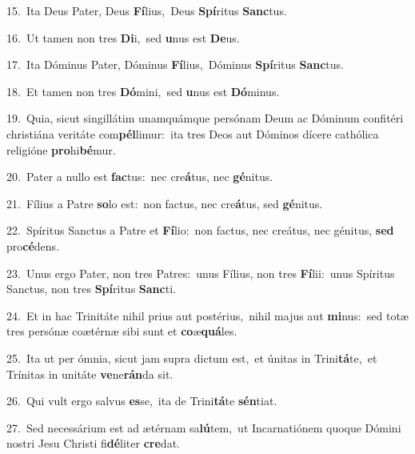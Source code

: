 {\numbfont\textcolor{\numbcolor}{15.}}~Ita Deus Pater, Deus \textbf{Fí}\-lius,~\star Deus \textbf{Spí}\-ritus \textbf{Sanc}\-tus.\par
{\numbfont\textcolor{\numbcolor}{16.}}~Ut tamen non tres \textbf{Di}\-i,~\star sed \textbf{u}\-nus est \textbf{De}\-us.\par
{\numbfont\textcolor{\numbcolor}{17.}}~Ita Dóminus Pater, Dóminus \textbf{Fí}\-lius,~\star Dóminus \textbf{Spí}\-ritus \textbf{Sanc}\-tus.\par
{\numbfont\textcolor{\numbcolor}{18.}}~Et tamen non tres \textbf{Dó}\-mini,~\star sed \textbf{u}\-nus est \textbf{Dó}\-minus.\par
{\numbfont\textcolor{\numbcolor}{19.}}~Quia, sicut singillátim unamquámque persónam Deum ac Dóminum confitéri christiána veritáte com\-\textbf{pél}\-limur:~\star ita tres Deos aut Dóminos dícere cathólica religióne \textbf{pro}\-hi\-\textbf{bé}\-mur.\par
{\numbfont\textcolor{\numbcolor}{20.}}~Pater a nullo est \textbf{fac}\-tus:~\star nec cre\-\textbf{á}\-tus, nec \textbf{gé}\-nitus.\par
{\numbfont\textcolor{\numbcolor}{21.}}~Fílius a Patre \textbf{so}\-lo est:~\star non factus, nec cre\-\textbf{á}\-tus, sed \textbf{gé}\-nitus.\par
{\numbfont\textcolor{\numbcolor}{22.}}~Spíritus Sanctus a Patre et \textbf{Fí}\-lio:~\star non factus, nec creátus, nec génitus, \textbf{sed} pro\-\textbf{cé}\-dens.\par
{\numbfont\textcolor{\numbcolor}{23.}}~Unus ergo Pater, non tres Patres:~\dagger unus Fílius, non tres \textbf{Fí}\-lii:~\star unus Spíritus Sanctus, non tres \textbf{Spí}\-ritus \textbf{Sanc}\-ti.\par
{\numbfont\textcolor{\numbcolor}{24.}}~Et in hac Trinitáte nihil prius aut postérius,~\dagger nihil majus aut \textbf{mi}\-nus:~\star sed totæ tres persónæ coætérnæ sibi sunt et \textbf{co}\-æ\-\textbf{quá}\-les.\par
{\numbfont\textcolor{\numbcolor}{25.}}~Ita ut per ómnia, sicut jam supra dictum est,~\dagger et únitas in Trini\-\textbf{tá}\-te,~\star et Trínitas in unitáte \textbf{ve}\-ne\-\textbf{rán}\-da sit.\par
{\numbfont\textcolor{\numbcolor}{26.}}~Qui vult ergo salvus \textbf{es}\-se,~\star ita de Trini\-\textbf{tá}\-te \textbf{sén}\-tiat.\par
{\numbfont\textcolor{\numbcolor}{27.}}~Sed necessárium est ad ætérnam sa\-\textbf{lú}\-tem,~\star ut Incarnatiónem quoque Dómini nostri Jesu Christi fi\-\textbf{dé}\-liter \textbf{cre}\-dat.\par
